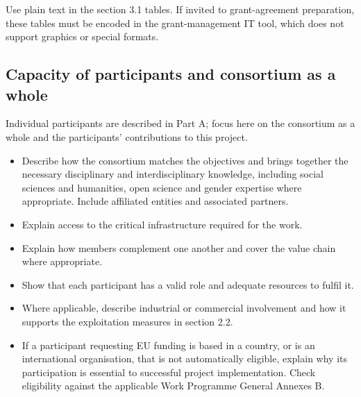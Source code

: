 

\begin{heguidance}
Use plain text in the section 3.1 tables. If invited to grant-agreement
preparation, these tables must be encoded in the grant-management IT tool,
which does not support graphics or special formats.
\end{heguidance}










\subsection{Capacity of participants and consortium as a whole}
\label{sec:consortium}
\begin{heguidance}
Individual participants are described in Part A; focus here on the consortium
as a whole and the participants' contributions to this project.
\begin{itemize}
  \item Describe how the consortium matches the objectives and brings
  together the necessary disciplinary and interdisciplinary knowledge,
  including social sciences and humanities, open science and gender expertise
  where appropriate. Include affiliated entities and associated partners.
  \item Explain access to the critical infrastructure required for the work.
  \item Explain how members complement one another and cover the value chain
  where appropriate.
  \item Show that each participant has a valid role and adequate resources
  to fulfil it.
  \item Where applicable, describe industrial or commercial involvement
  and how it supports the exploitation measures in section 2.2.
  \item If a participant requesting EU funding is based in a country, or is
  an international organisation, that is not automatically eligible, explain
  why its participation is essential to successful project implementation.
  Check eligibility against the applicable Work Programme General Annexes B.
\end{itemize}
\end{heguidance}

